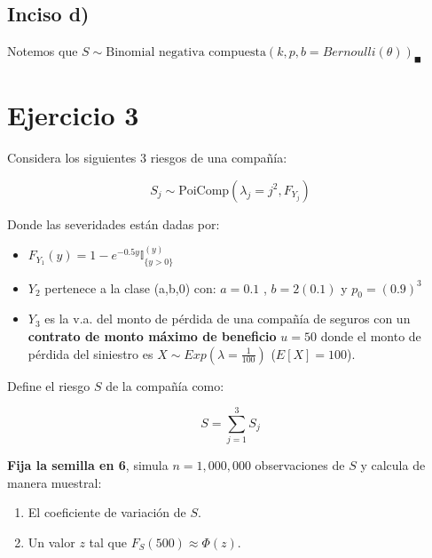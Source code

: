 \documentclass[
]{article}
\providecommand{\tightlist}{%
  \setlength{\itemsep}{0pt}\setlength{\parskip}{0pt}}
\begin{document}
\hypertarget{inciso-d-1}{%
\subsection{Inciso d)}\label{inciso-d-1}}

Notemos que
\(S \sim \text{Binomial negativa compuesta} (k,p,b = Bernoulli(\theta))_\blacksquare\)

\hypertarget{ejercicio-3}{%
\section{Ejercicio 3}\label{ejercicio-3}}

Considera los siguientes 3 riesgos de una compañía:

\[S_j\sim\text{PoiComp}\left(\lambda_j=j^2,F_{Y_j}\right)\]

Donde las severidades están dadas por:

\begin{itemize}
\tightlist
\item
  \(F_{Y_1}(y)=1-e^{-0.5y} \mathbb{I}^{(y)}_{\{y>0\}}\)
\item
  \(Y_2\) pertenece a la clase (a,b,0) con: \(a=0.1\) , \(b=2(0.1)\) y
  \(p_0=(0.9)^{3}\)
\item
  \(Y_3\) es la v.a. del monto de pérdida de una compañía de seguros con
  un \textbf{contrato de monto máximo de beneficio} \(u=50\) donde el
  monto de pérdida del siniestro es
  \(X\sim Exp\left(\lambda=\frac{1}{100}\right)\) (\(E[X]=100\)).
\end{itemize}

Define el riesgo \(S\) de la compañía como:

\[S=\sum_{j=1}^{3} S_j\]

\textbf{Fija la semilla en 6}, simula \(n=1,000,000\) observaciones de
\(S\) y calcula de manera muestral:

\begin{enumerate}[label=(\alph*)]
\item  El coeficiente de variación de $S$.
\item  Un valor $z$ tal que $F_S(500)\approx \Phi(z)$.
\end{enumerate}
\end{document}
